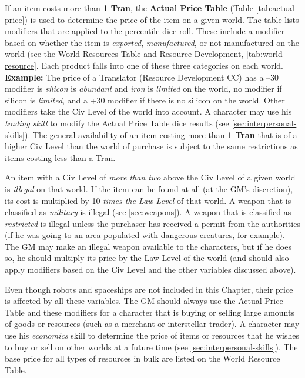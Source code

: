If an item costs more than \textbf{1 Tran}, the \textbf{Actual Price
  Table} (Table \vref{tab:actual-price}) is used to determine the
price of the item on a given world. The table lists modifiers that are
applied to the percentile dice roll. These include a modifier based on
whether the item is \emph{exported}, \emph{manufactured}, or not
manufactured on the world (see the World Resources Table and Resource
Development, \ref{tab:world-resource}.  Each product falls into one of
these three categories on each world.  \textbf{Example:} The price of
a Translator (Resource Development CC) has a --30 modifier is
\emph{silicon} is \emph{abundant} and \emph{iron} is \emph{limited} on
the world, no modifier if silicon is \emph{limited}, and a +30
modifier if there is no silicon on the world.  Other modifiers take
the Civ Level of the world into account. A character may use his
\emph{trading skill} to modify the Actual Price Table dice results (see
\ref{sec:interpersonal-skills}). The general availability of an item
costing more than \textbf{1 Tran} that is of a higher Civ Level than the world
of purchase is subject to the same restrictions as items costing less
than a Tran.

An item with a Civ Level of \emph{more than two} above the Civ Level
of a given world is \emph{illegal} on that world. If the item can be
found at all (at the GM's discretion), its cost is multiplied by 10
\emph{times the Law Level} of that world. A weapon that is classified
as \emph{military} is illegal (see \ref{sec:weapons}). A weapon that is
classified as \emph{restricted} is illegal unless the purchaser has
received a permit from the authorities (if he was going to an area
populated with dangerous creatures, for example). The GM may make an
illegal weapon available to the characters, but if he does so, he
should multiply its price by the Law Level of the world (and should
also apply modifiers based on the Civ Level and the other variables
discussed above).

Even though robots and spaceships are not included in this Chapter,
their price is affected by all these variables. The GM should always
use the Actual Price Table and these modifiers for a character that is
buying or selling large amounts of goods or resources (such as a
merchant or interstellar trader). A character may use his
\emph{economics} skill to determine the price of items or resources
that he wishes to buy or sell on other worlds at a future time (see
\ref{sec:interpersonal-skills}). The base price for all types of
resources in bulk are listed on the World Resource Table.

